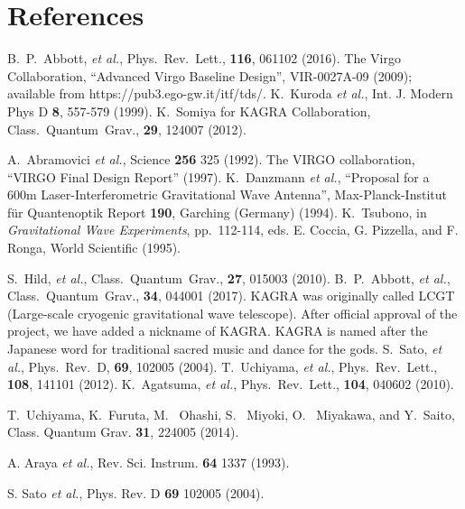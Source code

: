 \documentclass[prd ,twocolumn ,secnumarabic,dvips
,amssymb, amsmath,nobibnotes, aps, prd,superscriptaddress]{revtex4-1}
\begin{document}
{\section*{References}
\begin{thebibliography}{10}
 B.~P.~Abbott, {\it et al.}, Phys.~Rev.~Lett., \textbf{116}, 061102 (2016).
 The Virgo Collaboration, ``Advanced Virgo Baseline Design'',  
VIR-0027A-09 (2009); available from https://pub3.ego-gw.it/itf/tds/.
 K.~Kuroda {\it et al.},
Int. J. Modern Phys D \textbf{8},  557-579  (1999).
 K.~Somiya for KAGRA Collaboration, Class.~Quantum~Grav., \textbf{29}, 124007 (2012).

 A.~Abramovici {\it et al.},  Science \textbf{256} 325 (1992).
 The VIRGO collaboration, ``VIRGO Final Design Report''  (1997).
 K.~Danzmann {\it et al.}, ``Proposal for a 600m Laser-Interferometric Gravitational Wave Antenna'', Max-Planck-Institut f\"ur Quantenoptik Report \textbf{190}, Garching (Germany) (1994).
 K.~Tsubono,   
in \textit{Gravitational Wave Experiments}, pp.~112-114, eds. E. Coccia, G. Pizzella, and F. Ronga, World Scientific (1995).

 S.~Hild, {\it et al.}, Class.~Quantum~Grav., \textbf{27}, 015003 (2010).
 B.~P.~Abbott, {\it et al.}, Class.~Quantum~Grav., \textbf{34}, 044001 (2017).
 KAGRA was originally called LCGT (Large-scale cryogenic gravitational wave telescope). After official approval of the project, we have added a nickname of KAGRA. KAGRA is named after the Japanese word for traditional sacred music and dance for the gods.
 S.~Sato, {\it et al.}, Phys.~Rev.~D, \textbf{69}, 102005 (2004).
 T.~Uchiyama, {\it et al.}, Phys.~Rev.~Lett., \textbf{108}, 141101 (2012).
 K.~Agatsuma, {\it et al.}, Phys.~Rev.~Lett., \textbf{104}, 040602 (2010).

 T.~Uchiyama, K.~Furuta, M.~ Ohashi, S.~ Miyoki, O.~ Miyakawa, and Y.~Saito, Class. Quantum Grav. {\bf 31}, 224005 (2014).

A. Araya {\it et al.}, Rev. Sci. Instrum. {\bf 64}  1337 (1993).

S. Sato {\it et al.}, Phys. Rev. D {\bf 69}  102005 (2004).


\end{thebibliography}}
\end{document}

